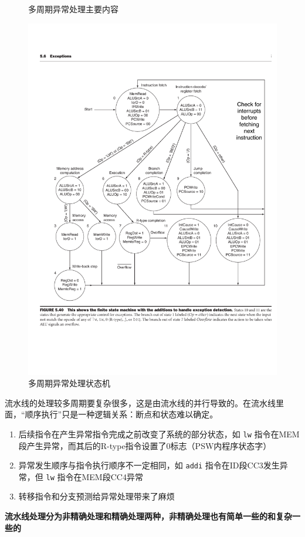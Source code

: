 \documentclass[]{report}
\begin{document}
\begin{figure}[h]
\begin{minipage}{20em}
\begin{minipage}{20em}
					\caption{多周期异常处理主要内容}
				\end{minipage}
			\end{minipage}
			\qquad
			\begin{minipage}{20em}
				\centering
				\includegraphics[scale = 0.32]{images/MultiCycle_Exceptions_FSM.pdf}
				\caption{多周期异常处理状态机}
			\end{minipage}
		\end{figure}\par
		流水线的处理较多周期要复杂很多，这是由流水线的并行导致的。在流水线里面，“顺序执行”只是一种逻辑关系：断点和状态难以确定。
		\begin{enumerate}
			\item 后续指令在产生异常指令完成之前改变了系统的部分状态，如 \verb|lw| 指令在MEM段产生异常，而其后的R-type指令设置了0标志（PSW内程序状态字）
			\item 异常发生顺序与指令执行顺序不一定相同，如 \verb|addi| 指令在ID段CC3发生异常，但 \verb|lw| 指令在MEM段CC4异常
			\item 转移指令和分支预测给异常处理带来了麻烦
		\end{enumerate}
		\textbf{流水线处理分为非精确处理和精确处理两种，非精确处理也有简单一些的和复杂一些的}
\end{document}
